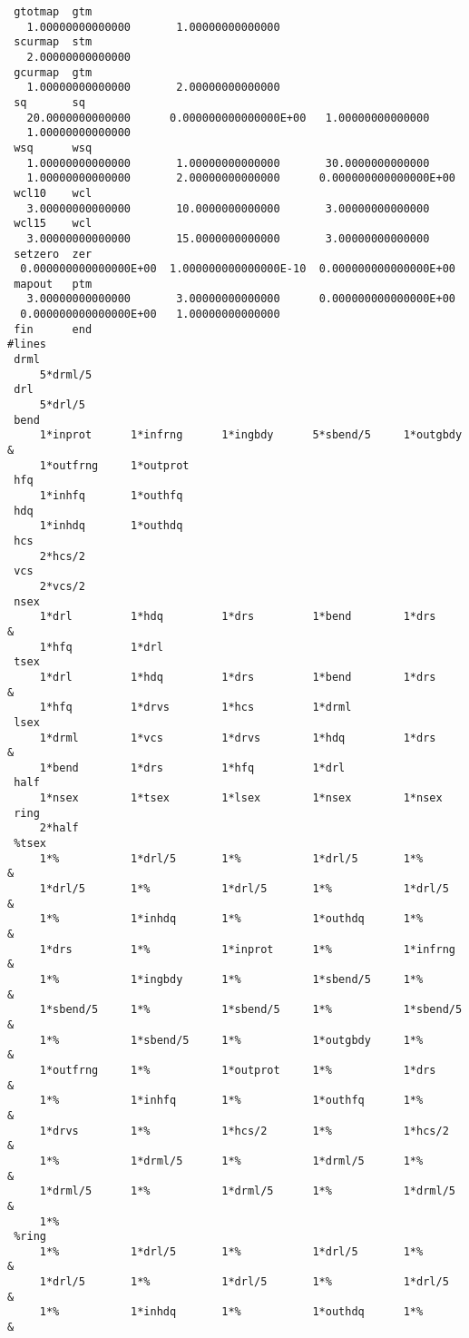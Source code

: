 \begin{footnotesize}
\begin{verbatim}
 gtotmap  gtm
   1.00000000000000       1.00000000000000
 scurmap  stm
   2.00000000000000
 gcurmap  gtm
   1.00000000000000       2.00000000000000
 sq       sq
   20.0000000000000      0.000000000000000E+00   1.00000000000000
   1.00000000000000
 wsq      wsq
   1.00000000000000       1.00000000000000       30.0000000000000
   1.00000000000000       2.00000000000000      0.000000000000000E+00
 wcl10    wcl
   3.00000000000000       10.0000000000000       3.00000000000000
 wcl15    wcl
   3.00000000000000       15.0000000000000       3.00000000000000
 setzero  zer
  0.000000000000000E+00  1.000000000000000E-10  0.000000000000000E+00
 mapout   ptm
   3.00000000000000       3.00000000000000      0.000000000000000E+00
  0.000000000000000E+00   1.00000000000000
 fin      end
#lines
 drml
     5*drml/5
 drl
     5*drl/5
 bend
     1*inprot      1*infrng      1*ingbdy      5*sbend/5     1*outgbdy  &
     1*outfrng     1*outprot
 hfq
     1*inhfq       1*outhfq
 hdq
     1*inhdq       1*outhdq
 hcs
     2*hcs/2
 vcs
     2*vcs/2
 nsex
     1*drl         1*hdq         1*drs         1*bend        1*drs      &
     1*hfq         1*drl
 tsex
     1*drl         1*hdq         1*drs         1*bend        1*drs      &
     1*hfq         1*drvs        1*hcs         1*drml
 lsex
     1*drml        1*vcs         1*drvs        1*hdq         1*drs      &
     1*bend        1*drs         1*hfq         1*drl
 half
     1*nsex        1*tsex        1*lsex        1*nsex        1*nsex
 ring
     2*half
 %tsex
     1*%           1*drl/5       1*%           1*drl/5       1*%        &
     1*drl/5       1*%           1*drl/5       1*%           1*drl/5    &
     1*%           1*inhdq       1*%           1*outhdq      1*%        &
     1*drs         1*%           1*inprot      1*%           1*infrng   &
     1*%           1*ingbdy      1*%           1*sbend/5     1*%        &
     1*sbend/5     1*%           1*sbend/5     1*%           1*sbend/5  &
     1*%           1*sbend/5     1*%           1*outgbdy     1*%        &
     1*outfrng     1*%           1*outprot     1*%           1*drs      &
     1*%           1*inhfq       1*%           1*outhfq      1*%        &
     1*drvs        1*%           1*hcs/2       1*%           1*hcs/2    &
     1*%           1*drml/5      1*%           1*drml/5      1*%        &
     1*drml/5      1*%           1*drml/5      1*%           1*drml/5   &
     1*%
 %ring
     1*%           1*drl/5       1*%           1*drl/5       1*%        &
     1*drl/5       1*%           1*drl/5       1*%           1*drl/5    &
     1*%           1*inhdq       1*%           1*outhdq      1*%        &

\end{verbatim}
\end{footnotesize}
